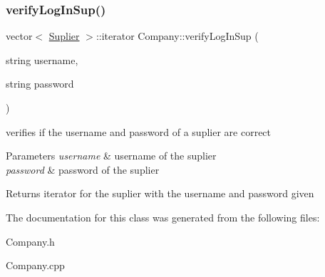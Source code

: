 \subsubsection{\texorpdfstring{verify\+Log\+In\+Sup()}{verifyLogInSup()}}
{\footnotesize\ttfamily vector$<$ \hyperlink{class_suplier}{Suplier} $>$\+::iterator Company\+::verify\+Log\+In\+Sup (\begin{DoxyParamCaption}\item[{string}]{username,  }\item[{string}]{password }\end{DoxyParamCaption})}



verifies if the username and password of a suplier are correct 


\begin{DoxyParams}{Parameters}
{\em username} & username of the suplier\\
\hline
{\em password} & password of the suplier\\
\hline
\end{DoxyParams}
\begin{DoxyReturn}{Returns}
iterator for the suplier with the username and password given 
\end{DoxyReturn}


The documentation for this class was generated from the following files\+:\begin{DoxyCompactItemize}
\item 
Company.\+h\item 
Company.\+cpp\end{DoxyCompactItemize}

